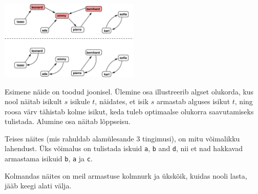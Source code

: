 \section*{\sampleexplanations}

\begin{center}
\includegraphics[width=0.5\textwidth]{polygonfig.pdf}
\end{center}

Esimene näide on toodud joonisel. Ülemine osa illustreerib algset olukorda, kus nool näitab isikult $s$ isikule $t$, 
näidates, et isik $s$ armastab alguses isikut $t$, ning roosa värv tähistab kolme isikut, keda tuleb optimaalse olukorra 
saavutamiseks tulistada. Alumine osa näitab lõppseisu.

Teises näites (mis rahuldab alamülesande 3 tingimusi), on mitu võimalikku lahendust.
Üks võimalus on tulistada iskuid \texttt{a}, \texttt{b} and \texttt{d}, nii et nad hakkavad armastama isikuid \texttt{b}, \texttt{a} ja \texttt{c}.

Kolmandas näites on meil armastuse kolmnurk ja ükskõik, kuidas nooli lasta, jääb keegi alati välja.
